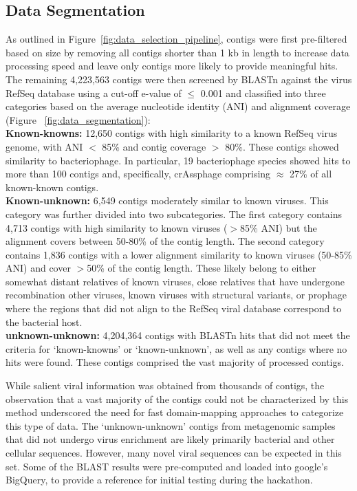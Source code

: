\documentclass[genes, moreauthors]{Definitions/mdpi}
\begin{document}
  \subsection{Data Segmentation}
  As outlined in Figure~\ref{fig:data_selection_pipeline}, contigs were first
  pre-filtered based on size by removing all contigs shorter than 1 kb in
  length to increase data processing speed and leave only contigs more likely
  to provide meaningful hits. The remaining 4,223,563 contigs were then
  screened by BLASTn \cite{Camacho2009} against the virus RefSeq database
  \cite{Brister2015} using a cut-off e-value of $\leq$ 0.001 and classified into
  three categories based on the average nucleotide identity (ANI) and alignment
  coverage (Figure ~\ref{fig:data_segmentation}):\\

    \textbf{Known-knowns:} 12,650 contigs with high similarity to a known RefSeq
    virus genome, with ANI $<$ 85\% and contig coverage $>$ 80\%. These contigs
    showed similarity to bacteriophage. In particular, 19 bacteriophage species
    showed hits to more than 100 contigs and, specifically, crAssphage
    comprising $\approx$ 27\% of all known-known contigs.\\

    \textbf{Known-unknown:} 6,549 contigs moderately similar to known viruses.
    This category was further divided into two subcategories. The first
    category contains 4,713 contigs with high similarity to known viruses
    ($>$85\% ANI) but the alignment covers between 50-80\% of the contig
    length. The second category contains  1,836 contigs with a  lower alignment
    similarity to known viruses (50-85\% ANI) and cover $>$50\% of the contig
    length. These likely belong to either somewhat distant relatives of known
    viruses, close relatives that have undergone recombination other viruses,
    known viruses with structural variants, or prophage where the regions that
    did not align to the RefSeq viral database correspond to the bacterial
    host.\\

    \textbf{unknown-unknown:} 4,204,364 contigs with BLASTn hits that did not
    meet the criteria for ‘known-knowns’ or ‘known-unknown’, as well as any
    contigs where no hits were found. These contigs comprised the vast majority
    of processed contigs.

  While salient viral information was obtained from thousands of contigs, the
  observation that a vast majority of the contigs could not be characterized by
  this method underscored the need for fast domain-mapping approaches to
  categorize this type of data. The ‘unknown-unknown’ contigs from metagenomic
  samples that did not undergo virus enrichment are likely primarily bacterial
  and other cellular sequences. However, many novel viral sequences can be
  expected in this set. Some of the BLAST results were pre-computed and loaded
  into google's BigQuery, to provide a reference for initial testing during the
  hackathon.
\end{document}
